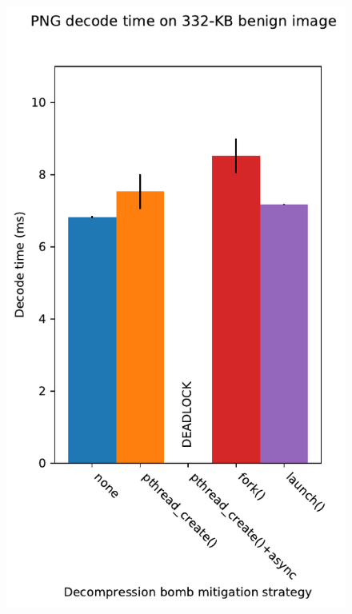 \begin{figure}[t]
	\begin{minipage}{0.94\columnwidth}
	\includegraphics[width=\textwidth]{figs/cerberus2_nns16_surplus256k_mirjam}
	\label{fig:libpng:benign}
	\end{minipage}
%
	\begin{minipage}{\columnwidth}

\end{minipage}
\end{figure}
